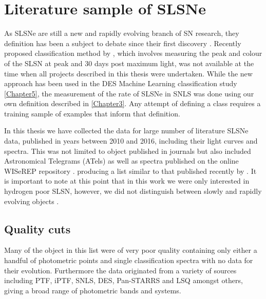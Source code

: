 \section{Literature sample of SLSNe}
As SLSNe are still a new and rapidly evolving branch of SN research, they definition has been a subject to debate since their first discovery \citep{Gal-Yam2012,Inserra2013,Nicholl2014}. Recently proposed classification method by \citet{Inserra2018}, which involves measuring the peak and colour of the SLSN at peak and 30 days post maximum light, was not available at the time when all projects described in this thesis were undertaken. While the new approach has been used in the DES Machine Learning classification study \cref{Chapter5}, the measurement of the rate of SLSNe in SNLS was done using our own definition described in \cref{Chapter3}. Any attempt of defining a class requires a training sample of examples that inform that definition. 

In this thesis we have collected the data for large number of literature SLSNe data, published in years between 2010 and 2016, including their light curves and spectra. This was not limited to object published in journals but also included Astronomical Telegrams (ATels) as well as spectra published on the online WISeREP repository \citep{Yaron2012}. producing a list similar to that published recently by \citet{Schulze2017}. It is important to note at this point that in this work we were only interested in hydrogen poor SLSN, however, we did not distinguish between slowly and rapidly evolving objects \citep{Gal-Yam2012,Inserra2013}. 

\subsection{Quality cuts}
Many of the object in this list were of very poor quality containing only either a handful of photometric points and single classification spectra with no data for their evolution. Furthermore the data originated from a variety of sources including PTF, iPTF, SNLS, DES, Pan-STARRS and LSQ amongst others, giving a broad range of photometric bands and systems.

